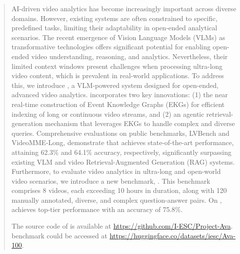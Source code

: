 \vspace{-1cm}
\begin{abstract}


AI-driven video analytics has become increasingly important across diverse domains. However, existing systems are often constrained to specific, predefined tasks, limiting their adaptability in open-ended analytical scenarios. The recent emergence of Vision Language Models (VLMs) as transformative technologies offers significant potential for enabling open-ended video understanding, reasoning, and analytics. Nevertheless, their limited context windows present challenges when processing ultra-long video content, which is prevalent in real-world applications. To address this, we introduce \sysname{}, a VLM-powered system designed for open-ended, advanced video analytics. \sysname{} incorporates two key innovations: (1) the near real-time construction of Event Knowledge Graphs (EKGs) for efficient indexing of long or continuous video streams, and (2) an agentic retrieval-generation mechanism that leverages EKGs to handle complex and diverse queries. Comprehensive evaluations on public benchmarks, LVBench and VideoMME-Long, demonstrate that \sysname{} achieves state-of-the-art performance, attaining 62.3\% and 64.1\% accuracy, respectively, significantly surpassing existing VLM and video Retrieval-Augmented Generation (RAG) systems. Furthermore, to  evaluate video analytics in ultra-long and open-world video scenarios, we introduce a new benchmark, . This benchmark comprises 8 videos, each exceeding 10 hours in duration, along with 120 manually annotated, diverse, and complex question-answer pairs. On , \sysname{} achieves top-tier performance with an accuracy of 75.8\%.

The source code of \sysname is available at \url{https://github.com/I-ESC/Project-Ava}.  benchmark could be accessed at \url{https://huggingface.co/datasets/iesc/Ava-100}.

\end{abstract}
